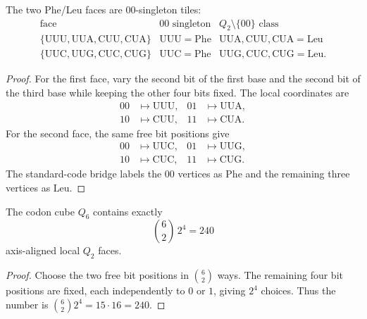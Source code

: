 \begin{theorem}
\label{thm:philosophy-phe-leu-zero-zero-singleton-tiles}
The two Phe/Leu faces are $00$-singleton tiles:
$$
\begin{array}{c|c|c}
  \text{face} & 00\text{ singleton} & Q_{2}\setminus\{00\}\text{ class}\\
\hline
  \{\mathrm{UUU},\mathrm{UUA},\mathrm{CUU},\mathrm{CUA}\}
    & \mathrm{UUU}=\mathrm{Phe}
    & \mathrm{UUA},\mathrm{CUU},\mathrm{CUA}=\mathrm{Leu}\\
  \{\mathrm{UUC},\mathrm{UUG},\mathrm{CUC},\mathrm{CUG}\}
    & \mathrm{UUC}=\mathrm{Phe}
    & \mathrm{UUG},\mathrm{CUC},\mathrm{CUG}=\mathrm{Leu}.
\end{array}
$$
\end{theorem}
\begin{proof}
For the first face, vary the second bit of the first base and the second
bit of the third base while keeping the other four bits fixed. The local
coordinates are
$$
\begin{aligned}
  00&\longmapsto\mathrm{UUU},&
  01&\longmapsto\mathrm{UUA},\\
  10&\longmapsto\mathrm{CUU},&
  11&\longmapsto\mathrm{CUA}.
\end{aligned}
$$
For the second face, the same free bit positions give
$$
\begin{aligned}
  00&\longmapsto\mathrm{UUC},&
  01&\longmapsto\mathrm{UUG},\\
  10&\longmapsto\mathrm{CUC},&
  11&\longmapsto\mathrm{CUG}.
\end{aligned}
$$
The standard-code bridge labels the $00$ vertices as $\mathrm{Phe}$ and
the remaining three vertices as $\mathrm{Leu}$.
\end{proof}

\begin{theorem}
\label{thm:philosophy-number-axis-aligned-q-two-faces}
The codon cube $Q_{6}$ contains exactly
$$
  \binom{6}{2}\,2^{4}=240
$$
axis-aligned local $Q_{2}$ faces.
\end{theorem}
\begin{proof}
Choose the two free bit positions in $\binom{6}{2}$ ways. The remaining
four bit positions are fixed, each independently to $0$ or $1$, giving
$2^{4}$ choices. Thus the number is $\binom{6}{2}2^{4}=15\cdot16=240$.
\end{proof}

